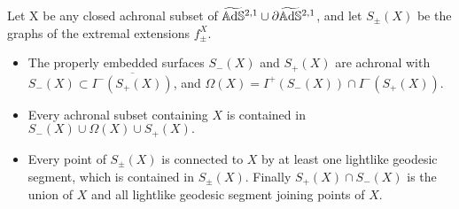 \begin{lemma}\label{422}
    Let X be any closed achronal subset of $\widetilde{\mathbb{A}\mathrm{d}\mathbb{S}}{}^{2,1}\cup\partial\widetilde{\mathbb{A}\mathrm{d}\mathbb{S}}{}^{2,1}$, and let $S_\pm(X)$ be the graphs of the extremal extensions $f_\pm^X$. 
    \begin{itemize}
        \item The properly embedded surfaces $S_-(X)$ and $S_+(X)$ are achronal with $S_-(X)\subset \overline{I^-(S_+(X))}$, and $\Omega(X)=I^+(S_-(X))\cap I^-(S_+(X)).$
        \item Every achronal subset containing $X$ is contained in $S_-(X)\cup\Omega(X)\cup S_+(X).$
        \item Every point of $S_\pm(X)$ is connected to $X$ by at least one lightlike geodesic segment, which is contained in $S_\pm(X).$ Finally $S_+(X)\cap S_-(X)$ is the union of $X$ and all lightlike geodesic segment joining points of $X$.
    \end{itemize}
\end{lemma}
